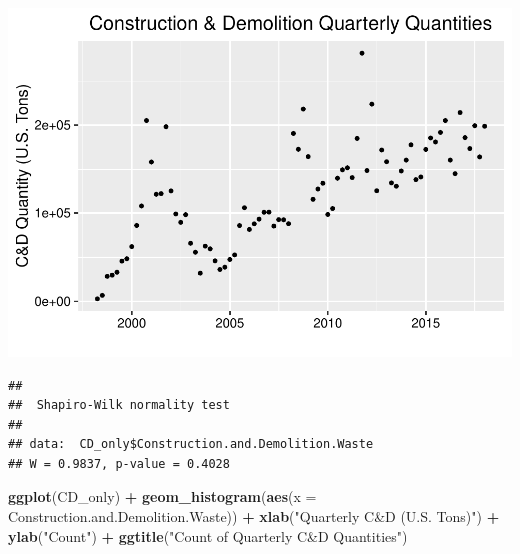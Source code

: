 \documentclass[12pt,]{article}
\newenvironment{Shaded}{\begin{snugshade}}{\end{snugshade}}
\newcommand{\KeywordTok}[1]{\textcolor[rgb]{0.13,0.29,0.53}{\textbf{#1}}}
\newcommand{\DataTypeTok}[1]{\textcolor[rgb]{0.13,0.29,0.53}{#1}}
\newcommand{\StringTok}[1]{\textcolor[rgb]{0.31,0.60,0.02}{#1}}
\newcommand{\CommentTok}[1]{\textcolor[rgb]{0.56,0.35,0.01}{\textit{#1}}}
\newcommand{\OperatorTok}[1]{\textcolor[rgb]{0.81,0.36,0.00}{\textbf{#1}}}
\newcommand{\NormalTok}[1]{#1}
\begin{document}
\includegraphics{SKo_Project_Template_files/figure-latex/Test3_1-1.pdf}

\begin{Shaded}
\end{Shaded}

\begin{verbatim}
## 
##  Shapiro-Wilk normality test
## 
## data:  CD_only$Construction.and.Demolition.Waste
## W = 0.9837, p-value = 0.4028
\end{verbatim}

\begin{Shaded}
\begin{Highlighting}[]
\KeywordTok{ggplot}\NormalTok{(CD_only) }\OperatorTok{+}
\StringTok{  }\KeywordTok{geom_histogram}\NormalTok{(}\KeywordTok{aes}\NormalTok{(}\DataTypeTok{x =}\NormalTok{ Construction.and.Demolition.Waste)) }\OperatorTok{+}\StringTok{ }
\StringTok{  }\KeywordTok{xlab}\NormalTok{(}\StringTok{"Quarterly C&D (U.S. Tons)"}\NormalTok{) }\OperatorTok{+}
\StringTok{  }\KeywordTok{ylab}\NormalTok{(}\StringTok{"Count"}\NormalTok{) }\OperatorTok{+}\StringTok{ }
\StringTok{  }\KeywordTok{ggtitle}\NormalTok{(}\StringTok{"Count of Quarterly C&D Quantities"}\NormalTok{)}
\end{Highlighting}
\end{Shaded}
\end{document}
